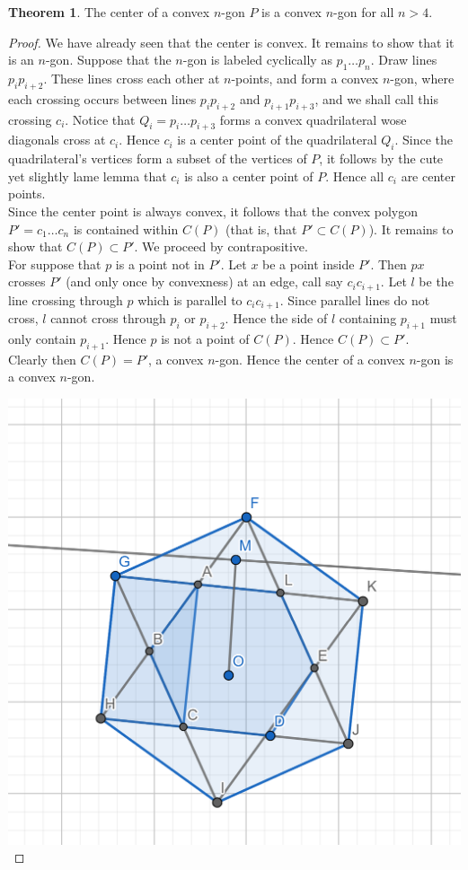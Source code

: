 \documentclass[12pt]{article}
\theoremstyle{definition}
\newtheorem{theorem}{Theorem}
\begin{document}
\begin{theorem}
The center of a convex $n$-gon $P$ is a convex $n$-gon for all $n>4$.
\end{theorem}

\begin{proof}
We have already seen that the center is convex. It remains to show that it is an $n$-gon. Suppose that the $n$-gon is labeled cyclically as $p_1\dots p_n$. Draw lines $p_ip_{i+2}$. These lines cross each other at $n$-points, and form a convex $n$-gon, where each crossing occurs between lines $p_ip_{i+2}$ and $p_{i+1}p_{i+3}$, and we shall call this crossing $c_i$. Notice that $Q_i = p_i\dots p_{i+3}$ forms a convex quadrilateral wose diagonals cross at $c_i$. Hence $c_i$ is a center point of the quadrilateral $Q_i$. Since the quadrilateral's vertices form a subset of the vertices of $P$, it follows by the cute yet slightly lame lemma that $c_i$ is also a center point of $P$. Hence all $c_i$ are center points. 
\\

Since the center point is always convex, it follows that the convex polygon $P'= c_1\dots c_n$ is contained within $C(P)$ (that is, that $P'\subset C(P)$). It remains to show that $C(P) \subset P'$. We proceed by contrapositive.\\

For suppose that $p$ is a point not in $P'$. Let $x$ be a point inside $P'$. Then $px$ crosses $P'$ (and only once by convexness) at an edge, call say $c_ic_{i+1}$. Let $l$ be the line crossing through $p$ which is parallel to $c_ic_{i+1}$. Since parallel lines do not cross, $l$ cannot cross through $p_{i}$ or $p_{i+2}$. Hence the side of $l$ containing $p_{i+1}$ must only contain $p_{i+1}$. Hence $p$ is not a point of $C(P)$. Hence $C(P)\subset P'$.\\

Clearly then $C(P) = P'$, a convex $n$-gon. Hence the center of a convex $n$-gon is a convex $n$-gon.  

\includegraphics[scale=0.5]{center-ngon.png} 



\end{proof}
\end{document}
